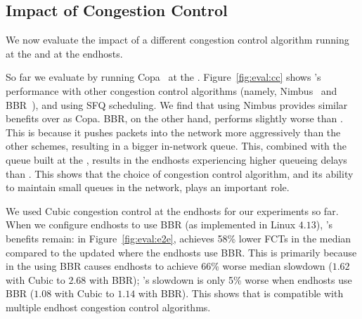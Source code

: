 \subsection{Impact of Congestion Control} \label{s:robust:cross}\label{s:eval:cc}

We now evaluate the impact of a different congestion control algorithm running at the \inbox and at the endhosts.
% 




 So far we evaluate \name by running Copa~\cite{copa} at the \inbox.  Figure~\ref{fig:eval:cc} shows \name's performance with other congestion control algorithms (namely, Nimbus~\cite{nimbus} and BBR~\cite{bbr}), and using SFQ scheduling. We find that using Nimbus provides similar benefits over \baseline as Copa. BBR, on the other hand, performs slightly worse than \baseline. This is because it pushes packets into the network more aggressively than the other schemes, resulting in a bigger in-network queue. This, combined with the queue built at the \name, results in the endhosts experiencing higher queueing delays than \baseline. This shows that the choice of congestion control algorithm, and its ability to maintain small queues in the network, plays an important role. 


We used Cubic congestion control at the endhosts for our experiments so far. When we configure endhosts to use BBR (as implemented in Linux $4.13$), \name's benefits remain: in Figure~\ref{fig:eval:e2e}, \name achieves 58\% lower FCTs in the median compared to the updated \baseline where the endhosts use BBR. 
This is primarily because in the \baseline using BBR causes endhosts to achieve 66\% worse median slowdown ($1.62$ with Cubic to $2.68$ with BBR); \name's slowdown is only 5\% worse when endhosts use BBR ($1.08$ with Cubic to $1.14$ with BBR). 
This shows that \name is compatible with multiple endhost congestion control algorithms.

